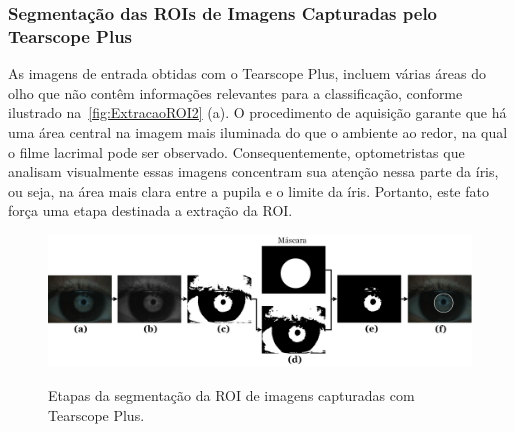 
\subsubsection{Segmentação das ROIs de Imagens Capturadas pelo Tearscope Plus}
\label{sec:metodoSegTearscopePlus}

As imagens de entrada obtidas com o Tearscope Plus, incluem várias áreas do olho que não contêm informações relevantes para a classificação, conforme ilustrado na~\autoref{fig:ExtracaoROI2} (a). O procedimento de aquisição garante que há uma área central na imagem mais iluminada do que o ambiente ao redor, na qual o filme lacrimal pode ser observado. Consequentemente, optometristas que analisam visualmente essas imagens concentram sua atenção nessa parte da íris, ou seja, na área mais clara entre a pupila e o limite da íris. Portanto, este fato força uma etapa destinada a extração da ROI.


\begin{figure}[ht!]
    \centering
    \caption{Etapas da segmentação da ROI de imagens capturadas com Tearscope Plus.}
    \includegraphics[width=15.8cm]{figs/ExtracaoROI3.png}
    \label{fig:ExtracaoROI2}
\end{figure}

